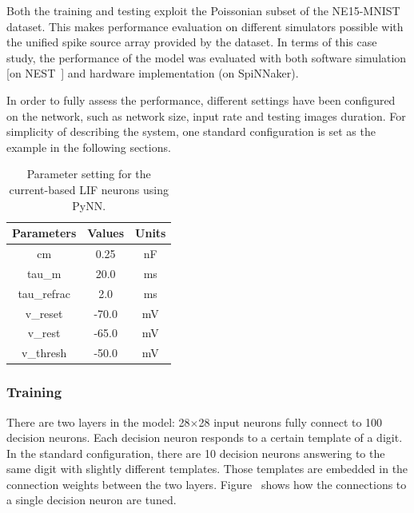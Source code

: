 \documentclass{frontiersENG} %
\begin{document}
Both the training and testing exploit the Poissonian subset of the NE15-MNIST dataset.
This makes performance evaluation on different simulators possible with the unified spike source array provided by the dataset. 
In terms of this case study, the performance of the model was evaluated with both software simulation [on NEST~\citep{gewaltig2007nest}] and hardware implementation (on SpiNNaker).

In order to fully assess the performance, different settings have been configured on the network, such as network size, input rate and testing images duration.
For simplicity of describing the system, one standard configuration is set as the example in the following sections.
\begin{table}[hbbp]
	\centering
	\caption{\label{tbl:pynnSetting}Parameter setting for the current-based LIF neurons using PyNN.}
	\bgroup
	\def\arraystretch{1.1}
	\begin{tabular}{c|c|c}
		Parameters & Values & Units \\
		\hline
		cm & 0.25 & nF	\\
		tau\_m & 20.0 & ms\\
		tau\_refrac & 2.0 & ms\\
		v\_reset & -70.0 & mV\\
		v\_rest & -65.0 & mV\\
		v\_thresh & -50.0 & mV\\
	\end{tabular}
	\egroup
\end{table}

\subsubsection{Training}
There are two layers in the model: 28$\times$28 input neurons fully connect to 100 decision neurons.
Each decision neuron responds to a certain template of a digit.
In the standard configuration, there are 10 decision neurons answering to the same digit with slightly different templates.
Those templates are embedded in the connection weights between the two layers.
Figure~ shows how the connections to a single decision neuron are tuned.
\end{document}
